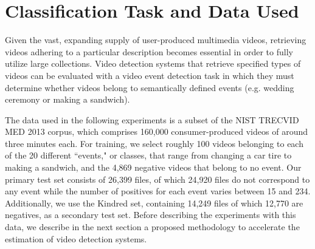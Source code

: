 \section{Classification Task and Data Used}
Given the vast, expanding supply of user-produced multimedia videos, retrieving videos adhering to a particular description becomes essential in order to fully utilize large collections. 
Video detection systems that retrieve specified types of videos can be evaluated with a video event detection task in which they must determine whether videos belong to semantically defined events (e.g. wedding ceremony or making a sandwich). 

The data used in the following experiments is a subset of the NIST TRECVID MED 2013 corpus, which comprises 160,000 consumer-produced videos of around three minutes each.
For training, we select roughly 100 videos belonging to each of the 20 different ``events," or classes, that range from changing a car tire to making a sandwich, and the 4,869 negative videos that belong to no event. 
Our primary test set consists of 26,399 files, of which 24,920 files do not correspond to any event while the number of positives for each event varies between 15 and 234. 
Additionally, we use the Kindred set, containing 14,249 files of which 12,770 are negatives, as a secondary test set. Before describing the experiments with this data, we describe in the next section a proposed methodology to accelerate the estimation of video detection systems.

